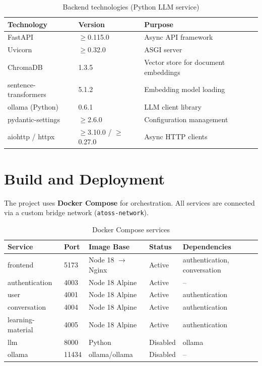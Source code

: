 \documentclass[a4paper,12pt]{report}
\begin{document}
\begin{table}[H]
\centering
\caption{Backend technologies (Python LLM service)}
\begin{tabularx}{\textwidth}{llX}
    \toprule
    \textbf{Technology} & \textbf{Version} & \textbf{Purpose} \\
    \midrule
    FastAPI & $\geq$0.115.0 & Async API framework \\
    Uvicorn & $\geq$0.32.0 & ASGI server \\
    ChromaDB & 1.3.5 & Vector store for document embeddings \\
    sentence-transformers & 5.1.2 & Embedding model loading \\
    ollama (Python) & 0.6.1 & LLM client library \\
    pydantic-settings & $\geq$2.6.0 & Configuration management \\
    aiohttp / httpx & $\geq$3.10.0 / $\geq$0.27.0 & Async HTTP clients \\
    \bottomrule
\end{tabularx}
\end{table}

\section{Build and Deployment}

The project uses \textbf{Docker Compose} for orchestration. All services are connected via a custom bridge network (\texttt{atoss-network}).

\begin{table}[H]
\centering
\caption{Docker Compose services}
\begin{tabularx}{\textwidth}{llllX}
    \toprule
    \textbf{Service} & \textbf{Port} & \textbf{Image Base} & \textbf{Status} & \textbf{Dependencies} \\
    \midrule
    frontend & 5173 & Node 18 $\rightarrow$ Nginx & Active & authentication, conversation \\
    authentication & 4003 & Node 18 Alpine & Active & -- \\
    user & 4001 & Node 18 Alpine & Active & authentication \\
    conversation & 4004 & Node 18 Alpine & Active & authentication \\
    learning-material & 4005 & Node 18 Alpine & Active & authentication \\
    llm & 8000 & Python & Disabled & ollama \\
    ollama & 11434 & ollama/ollama & Disabled & -- \\
    \bottomrule
\end{tabularx}
\end{table}
\end{document}
